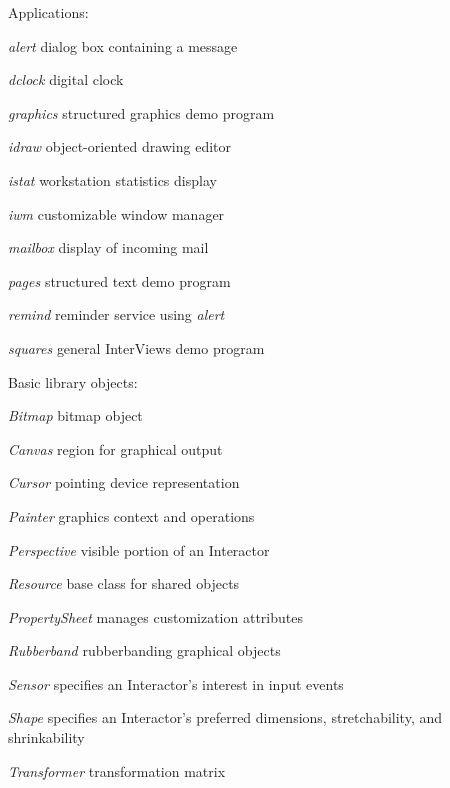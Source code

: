 \begin{defn}{Applications:}

\item [{\em alert} \hfill] dialog box containing a message
\item [{\em dclock} \hfill] digital clock
\item [{\em graphics} \hfill] structured graphics demo program
\item [{\em idraw} \hfill] object-oriented drawing editor
\item [{\em istat} \hfill] workstation statistics display
\item [{\em iwm} \hfill] customizable window manager
\item [{\em mailbox} \hfill] display of incoming mail
\item [{\em pages} \hfill] structured text demo program
\item [{\em remind} \hfill] reminder service using {\em alert}
\item [{\em squares} \hfill] general InterViews demo program

\end{defn}

\begin{defn}{Basic library objects:}

\item [{\em Bitmap} \hfill] bitmap object
\item [{\em Canvas} \hfill] region for graphical output
\item [{\em Cursor} \hfill] pointing device representation
\item [{\em Painter} \hfill] graphics context and operations
\item [{\em Perspective} \hfill] visible portion of an Interactor
\item [{\em Resource} \hfill] base class for shared objects
\item [{\em PropertySheet} \hfill] manages customization attributes
\item [{\em Rubberband} \hfill] rubberbanding graphical objects
\item [{\em Sensor} \hfill] specifies an Interactor's interest in input events
\item [{\em Shape} \hfill] specifies an Interactor's preferred 
    dimensions, stretchability, and shrinkability
\item [{\em Transformer} \hfill] transformation matrix

\end{defn}

